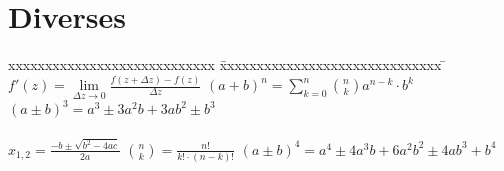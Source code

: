 \section{Diverses}
\begin{tabbing}
	xxxxxxxxxxxxxxxxxxxxxxxxxxxx \= xxxxxxxxxxxxxxxxxxxxxxxxxxxxxx \= \kill
	$f'(z) = \lim \limits_{\Delta z \rightarrow 0} \frac{f(z + \Delta z) -
		f(z)}{\Delta z}$ \> $(a + b)^n = \sum_{k=0}^{n} \binom n k a^{n-k} \cdot b^k$ \>
	$(a \pm b)^3 =a^3 \pm  3 a^{2} b + 3 a b^2 \pm b^3 $\\ \\
	$x_{1,2} = \frac{-b \pm \sqrt{b^2 - 4ac}}{2a}$ \> $\binom n k = \frac{n!}{k!
		\cdot (n-k)!}$ \> $(a \pm b)^4 =a^4 \pm  4 a^{3} b + 6a^2b^2 \pm 4 a b^3 +
	b^4$\\ 
\end{tabbing}

